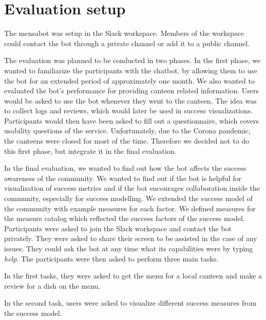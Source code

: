 \section{Evaluation setup}
The mensabot was setup in the Slack workspace. Members of the workspace could contact the bot through a private channel or add it to a public channel.

The evaluation was planned to be conducted in two phases.
In the first phase, we wanted to familiarize the participants with the chatbot, by allowing them to use the bot for an extended period of approximately one month. 
We also wanted to evaluated the bot's performance for providing canteen related information.
Users would be asked to use the bot whenever they went to the canteen. The idea was to collect logs and reviews, which would later be used in success visualizations. 
Participants would then have been asked to fill out a questionnaire, which covers usability questions of the service.  
Unfortunately, due to the Corona pandemic, the canteens were closed for most of the time. Therefore we decided not to do this first phase, but integrate it in the final evaluation.


In the final evaluation, we wanted to find out how the bot affects the success awareness of the community.
We wanted to find out if the bot is helpful for visualization of success metrics and if the bot encourages collaboration inside the community, especially for success modelling.
We extended the success model of the community with example measures for each factor. We defined measures for the measure catalog which reflected the success factors of the success model.
Participants were asked to join the Slack workspace and contact the bot privately. They were asked to share their screen to be assisted in the case of any issues. They could ask the bot at any time what its capabilities were by typing \emph{help}.
The participants were then asked to perform three main tasks.

In the first tasks, they were asked to get the menu for a local canteen and make a review for a dish on the menu. 

In the second task, users were asked to visualize different success measures from the success model.

